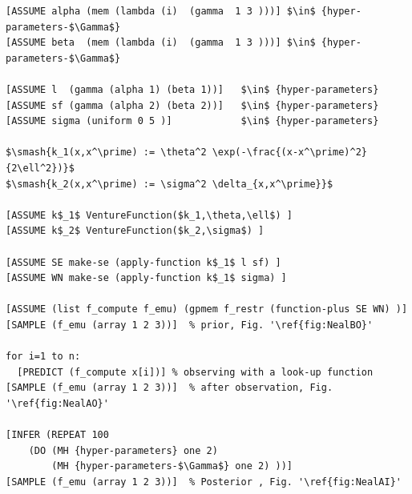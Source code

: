\documentclass{article} %
\begin{document}
\begin{minipage}{\linewidth}
\footnotesize
\belowcaptionskip=-10pt
\begin{lstlisting}[frame=single,caption=Hierarchical  GP Smoothing,mathescape,label=alg:gphierarch,escapechar=']
[ASSUME alpha (mem (lambda (i)  (gamma  1 3 )))] $\in$ {hyper-parameters-$\Gamma$} 
[ASSUME beta  (mem (lambda (i)  (gamma  1 3 )))] $\in$ {hyper-parameters-$\Gamma$} 

[ASSUME l  (gamma (alpha 1) (beta 1))]   $\in$ {hyper-parameters} 
[ASSUME sf (gamma (alpha 2) (beta 2))]   $\in$ {hyper-parameters}
[ASSUME sigma (uniform 0 5 )]            $\in$ {hyper-parameters}

$\smash{k_1(x,x^\prime) := \theta^2 \exp(-\frac{(x-x^\prime)^2}{2\ell^2})}$
$\smash{k_2(x,x^\prime) := \sigma^2 \delta_{x,x^\prime}}$

[ASSUME k$_1$ VentureFunction($k_1,\theta,\ell$) ]
[ASSUME k$_2$ VentureFunction($k_2,\sigma$) ]

[ASSUME SE make-se (apply-function k$_1$ l sf) ]
[ASSUME WN make-se (apply-function k$_1$ sigma) ]

[ASSUME (list f_compute f_emu) (gpmem f_restr (function-plus SE WN) )]
[SAMPLE (f_emu (array 1 2 3))]  % prior, Fig. '\ref{fig:NealBO}'

for i=1 to n:
  [PREDICT (f_compute x[i])] % observing with a look-up function
[SAMPLE (f_emu (array 1 2 3))]  % after observation, Fig. '\ref{fig:NealAO}'
  
[INFER (REPEAT 100 
	(DO (MH {hyper-parameters} one 2)
	    (MH {hyper-parameters-$\Gamma$} one 2) ))]
[SAMPLE (f_emu (array 1 2 3))]  % Posterior , Fig. '\ref{fig:NealAI}'
\end{lstlisting}
\end{minipage}
\end{document}
